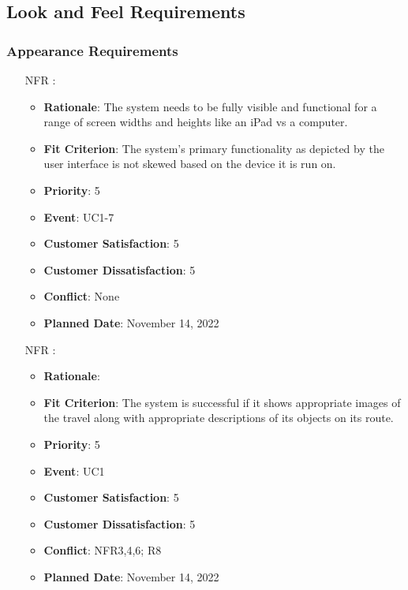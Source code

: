 \documentclass[12pt, titlepage]{article}
\newcounter{reqnum} %
\newcounter{freqnum} %
\begin{document}
\subsection{Look and Feel Requirements}


\subsubsection{Appearance Requirements}
\begin{itemize}
\item[NFR\refstepcounter{freqnum}\thefreqnum
\label{NFR}:] 
\begin{itemize}
    \item \textbf{Rationale}: The system needs to be fully visible and functional for a range of screen widths and heights like an iPad vs a computer.
    \item \textbf{Fit Criterion}: The system's primary functionality as depicted by the user interface is not skewed based on the device it is run on.
    \item \textbf{Priority}: 5
    \item \textbf{Event}: UC1-7 %
    \item \textbf{Customer Satisfaction}: 5
    \item \textbf{Customer Dissatisfaction}: 5
    \item \textbf{Conflict}: None
    \item \textbf{Planned Date}: November 14, 2022
\end{itemize}
\item[NFR\refstepcounter{freqnum}\thefreqnum
\label{NFR}:] 
\begin{itemize}
    \item \textbf{Rationale}:
    \item \textbf{Fit Criterion}: The system is successful if it shows appropriate images of the travel along with appropriate descriptions of its objects on its route.
    \item \textbf{Priority}: 5
    \item \textbf{Event}: UC1 %
    \item \textbf{Customer Satisfaction}: 5
    \item \textbf{Customer Dissatisfaction}: 5
    \item \textbf{Conflict}: NFR3,4,6; R8
    \item \textbf{Planned Date}: November 14, 2022
\end{itemize}


\end{itemize}
\end{document}
